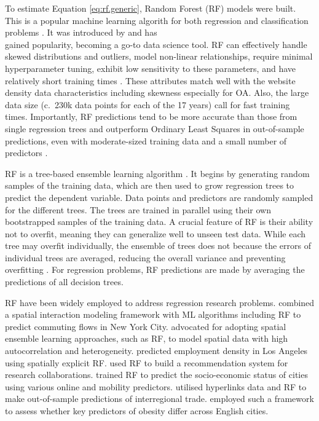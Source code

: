 \documentclass[
  authoryear,
  preprint,
  3p]{elsarticle}
\begin{document}
To estimate Equation \ref{eq:rf.generic}, Random Forest (RF) models were
built. This is a popular machine learning algorith for both regression
and classification problems \citep{biau2012analysis}. It was introduced
by \citet{breiman2001random} and has\\
gained popularity, becoming a go-to data science tool. RF can
effectively handle skewed distributions and outliers, model non-linear
relationships, require minimal hyperparameter tuning, exhibit low
sensitivity to these parameters, and have relatively short training
times \citep{Caruana2008, liaw2002classification, yan2020using}. These
attributes match well with the website density data characteristics
including skewness especially for OA. Also, the large data size (c.~230k
data points for each of the 17 years) call for fast training times.
Importantly, RF predictions tend to be more accurate than those from
single regression trees and outperform Ordinary Least Squares in
out-of-sample predictions, even with moderate-sized training data and a
small number of predictors
\citep{mullainathan2017machine, athey2019machine, sulaiman2011intelligent, pourebrahim2019trip, biau2012analysis}.

RF is a tree-based ensemble learning algorithm
\citep{breiman2001random}. It begins by generating random samples of the
training data, which are then used to grow regression trees to predict
the dependent variable. Data points and predictors are randomly sampled
for the different trees. The trees are trained in parallel using their
own bootstrapped samples of the training data. A crucial feature of RF
is their ability not to overfit, meaning they can generalize well to
unseen test data. While each tree may overfit individually, the ensemble
of trees does not because the errors of individual trees are averaged,
reducing the overall variance and preventing overfitting
\citep{last2002improving}. For regression problems, RF predictions are
made by averaging the predictions of all decision trees.

RF have been widely employed to address regression research problems.
\citet{pourebrahim2019trip} combined a spatial interaction modeling
framework with ML algorithms including RF to predict commuting flows in
New York City. \citet{sinha2019assessing} advocated for adopting spatial
ensemble learning approaches, such as RF, to model spatial data with
high autocorrelation and heterogeneity. \citet{creditspatial} predicted
employment density in Los Angeles using spatially explicit RF.
\citet{guns2014recommending} used RF to build a recommendation system
for research collaborations. \citet{ren2019predicting} trained RF to
predict the socio-economic status of cities using various online and
mobility predictors. \citet{tranos2023using} utilised hyperlinks data
and RF to make out-of-sample predictions of interregional trade.
\citet{zhou2023geography} employed such a framework to assess whether
key predictors of obesity differ across English cities.
\end{document}
